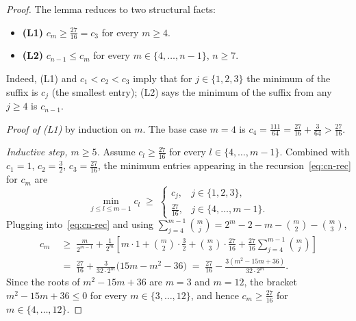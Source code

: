 \documentclass{article}
\theoremstyle{remark}
\begin{document}
\begin{proof}
The lemma reduces to two structural facts:
\begin{itemize}
  \item \textbf{(L1)} $c_{m}\ge\tfrac{27}{16}=c_{3}$ for every $m\ge 4$.
  \item \textbf{(L2)} $c_{n-1}\le c_{m}$ for every $m\in\{4,\dots,n-1\}$,
        $n\ge 7$.
\end{itemize}
Indeed, (L1) and $c_{1}<c_{2}<c_{3}$ imply that for $j\in\{1,2,3\}$
the minimum of the suffix is $c_{j}$ (the smallest entry); (L2) says
the minimum of the suffix from any $j\ge 4$ is $c_{n-1}$.

\medskip
\emph{Proof of (L1)} by induction on $m$. The base case $m=4$ is
$c_{4}=\tfrac{111}{64}=\tfrac{27}{16}+\tfrac{3}{64}>\tfrac{27}{16}$.

\emph{Inductive step, $m\ge 5$.} Assume $c_{l}\ge\tfrac{27}{16}$ for
every $l\in\{4,\dots,m-1\}$. Combined with $c_{1}=1$, $c_{2}=\tfrac32$,
$c_{3}=\tfrac{27}{16}$, the minimum entries appearing in the
recursion~\eqref{eq:cn-rec} for $c_{m}$ are
\[
  \min_{j\le l\le m-1}c_{l}\;\ge\;
  \begin{cases}
    c_{j}, & j\in\{1,2,3\},\\
    \tfrac{27}{16}, & j\in\{4,\dots,m-1\}.
  \end{cases}
\]
Plugging into~\eqref{eq:cn-rec} and using
$\sum_{j=4}^{m-1}\binom{m}{j}=2^{m}-2-m-\binom{m}{2}-\binom{m}{3}$,
\begin{align*}
  c_{m}
  &\;\ge\;\frac{m}{2^{m-1}}+\frac{1}{2^{m}}\!\left[m\cdot 1+\binom{m}{2}\!\cdot\!\tfrac32+\binom{m}{3}\!\cdot\!\tfrac{27}{16}+\tfrac{27}{16}\!\sum_{j=4}^{m-1}\!\binom{m}{j}\right]\\
  &\;=\;\tfrac{27}{16}+\frac{3}{32\cdot 2^{m}}\bigl(15m-m^{2}-36\bigr)
   \;=\;\tfrac{27}{16}-\frac{3(m^{2}-15m+36)}{32\cdot 2^{m}}.
\end{align*}
Since the roots of $m^{2}-15m+36$ are $m=3$ and $m=12$, the bracket
$m^{2}-15m+36\le 0$ for every $m\in\{3,\dots,12\}$, and hence
$c_{m}\ge\tfrac{27}{16}$ for $m\in\{4,\dots,12\}$.


\end{proof}
\end{document}

